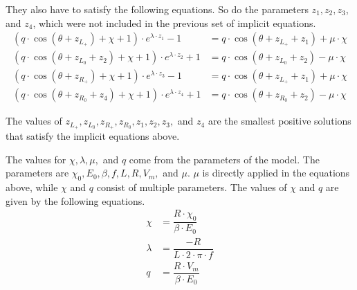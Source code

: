 They also have to satisfy the following equations.
So do the parameters $z_1, z_2, z_3$, and $z_4$, which were not included in the previous set of implicit equations.
\begin{subequations}
	\begin{align}
		(q \cdot \cos(\theta + z_{L_+}) + \chi + 1) \cdot e^{\lambda \cdot z_1} - 1
		 & = q \cdot  \cos(\theta + z_{L_+} + z_1) + \mu \cdot \chi \\
		(q \cdot \cos(\theta + z_{L_0} + z_2) + \chi + 1) \cdot e^{\lambda \cdot z_2} + 1
		 & = q \cdot  \cos(\theta + z_{L_0} + z_2) - \mu \cdot \chi \\
		(q \cdot \cos(\theta + z_{R_+}) + \chi + 1) \cdot e^{\lambda \cdot z_3} - 1
		 & = q \cdot  \cos(\theta + z_{L_+} + z_1) + \mu \cdot \chi \\
		(q \cdot \cos(\theta + z_{R_0} + z_4) + \chi + 1) \cdot e^{\lambda \cdot z_4} + 1
		 & = q \cdot  \cos(\theta + z_{R_0} + z_2) - \mu \cdot \chi
	\end{align}
\end{subequations}

The values of $z_{L_+}, z_{L_0}, z_{R_+}, z_{R_0}, z_1, z_2, z_3,$ and $z_4$ are the smallest positive solutions that satisfy the implicit equations above.


The values for $\chi, \lambda, \mu,$ and $q$ come from the parameters of the model.
The parameters are $\chi_0, E_0, \beta, f, L, R, V_m,$ and $\mu$.
$\mu$ is directly applied in the equations above, while $\chi$ and $q$ consist of multiple parameters.
The values of $\chi$ and $q$ are given by the following equations.
\begin{subequations}
	\begin{align}
		\chi    & = \dfrac{R \cdot \chi_0}{\beta \cdot E_0} \\
		\lambda & = \dfrac{-R}{L \cdot 2 \cdot \pi \cdot f} \\
		q       & = \dfrac{R \cdot V_m}{\beta \cdot E_0}
	\end{align}
\end{subequations}
